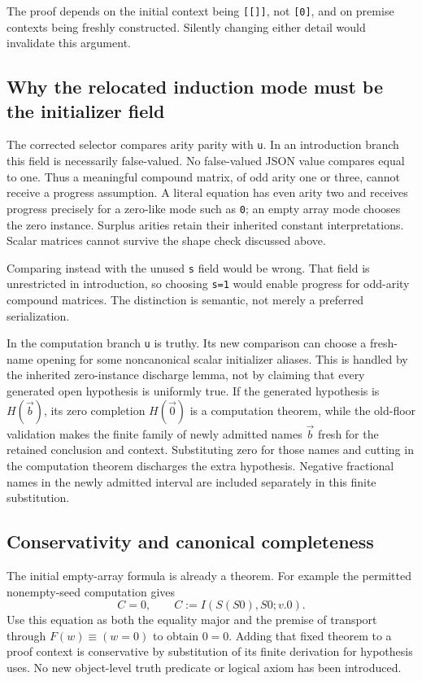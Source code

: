 \documentclass[11pt,letterpaper]{article}
\theoremstyle{definition}\newtheorem{definition}[theorem]{Definition}
\theoremstyle{remark}\newtheorem{remark}[theorem]{Remark}
\begin{document}
The proof depends on the initial context being \texttt{[[]]}, not
\texttt{[0]}, and on premise contexts being freshly constructed.
Silently changing either detail would invalidate this argument.

\subsection{Why the relocated induction mode must be the initializer field}

The corrected selector compares arity parity with \texttt{u}.  In an
introduction branch this field is necessarily false-valued.  No
false-valued JSON value compares equal to one.  Thus a meaningful
compound matrix, of odd arity one or three, cannot receive a progress
assumption.  A literal equation has even arity two and receives
progress precisely for a zero-like mode such as \texttt{0}; an empty
array mode chooses the zero instance.  Surplus arities retain their
inherited constant interpretations.  Scalar matrices cannot survive
the shape check discussed above.

Comparing instead with the unused \texttt{s} field would be wrong.
That field is unrestricted in introduction, so choosing
\texttt{s=1} would enable progress for odd-arity compound matrices.
The distinction is semantic, not merely a preferred serialization.

In the computation branch \texttt{u} is truthy.  Its new comparison can
choose a fresh-name opening for some noncanonical scalar initializer
aliases.  This is handled by the inherited zero-instance discharge
lemma, not by claiming that every generated open hypothesis is
uniformly true.  If the generated hypothesis is $H(\vec b)$, its zero
completion $H(\vec0)$ is a computation theorem, while the old-floor
validation makes the finite family of newly admitted names $\vec b$
fresh for the retained conclusion and context.  Substituting zero for
those names and cutting in the computation theorem discharges the
extra hypothesis.  Negative fractional names in the newly admitted
interval are included separately in this finite substitution.

\subsection{Conservativity and canonical completeness}

The initial empty-array formula is already a theorem.  For example the
permitted nonempty-seed computation gives
\[
 C=0,\qquad C:=I(S(S0),S0;v.0).
\]
Use this equation as both the equality major and the premise of
transport through $F(w)\equiv(w=0)$ to obtain $0=0$.  Adding that fixed
theorem to a proof context is conservative by substitution of its
finite derivation for hypothesis uses.  No new object-level truth
predicate or logical axiom has been introduced.
\end{document}
